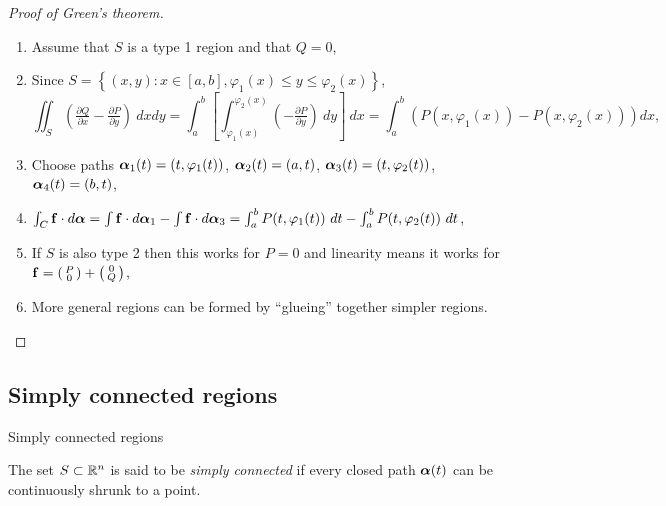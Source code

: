 {}


\begin{proof}[Proof of Green's theorem]
    \begin{enumerate}
        \item Assume that \(S\) is a type 1 region and that \(Q=0\),
        \item Since \(S = \left\{(x,y): x \in [a,b], \varphi_1(x) \leq y \leq \varphi_2(x)\right\}\),
              \[
                  \iint_{S}  \left(\tfrac{\partial Q}{\partial x} - \tfrac{\partial P}{\partial y}\right) \ dxdy =
                  \int_{a}^{b}\left[\int_{\varphi_1(x)}^{\varphi_2(x)}  (- \tfrac{\partial P}{\partial y}) \ dy\right] \ dx
                  = \int_{a}^{b}  (P(x,\varphi_1(x))-P(x,\varphi_2(x)))   dx,
              \]
        \item Choose paths \(\boldsymbol{\alpha}_1(t) = (t,\varphi_1(t))\), \(\boldsymbol{\alpha}_2(t) = (a,t)\), \(\boldsymbol{\alpha}_3(t) = (t,\varphi_2(t))\), \(\boldsymbol{\alpha}_4(t) = (b,t)\),
        \item \(\int_{C} \ff \cdot d\aalpha = \int \ff \cdot d\aalpha_1 - \int \ff \cdot d\aalpha_3 = \int_{a}^{b} P(t,\varphi_1(t)) \ dt -  \int_{a}^{b} P(t,\varphi_2(t)) \ dt \),
        \item If \(S\) is also type 2 then this works for \(P=0\) and linearity means it works for \(\mathbf{f} = \left(\begin{smallmatrix}
                  P \\ 0
              \end{smallmatrix}\right)+\left(\begin{smallmatrix}
                  0 \\ Q
              \end{smallmatrix}\right)\),
        \item More general regions can be formed by ``glueing'' together simpler regions.
    \end{enumerate}
\end{proof}




\subsection{Simply connected regions}


{Simply connected regions}


\begin{definition}
    The set \(S\subset \mathbb{R}^n\) is said to be \emph{simply connected} if every closed path \(\boldsymbol{\alpha}(t)\) can be continuously shrunk to a point.
\end{definition}



